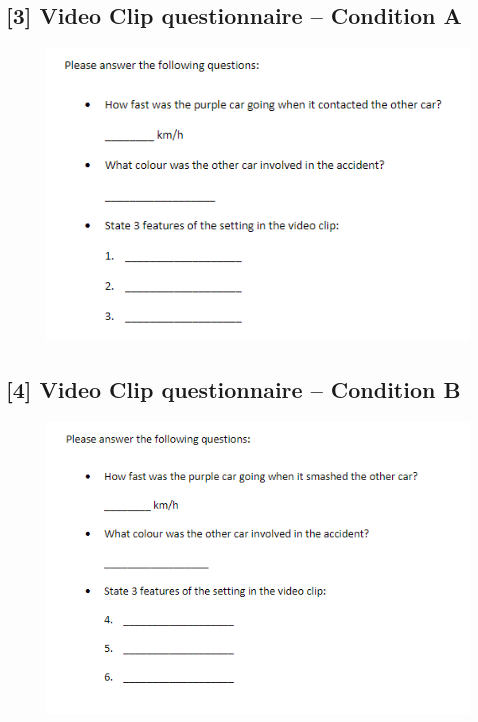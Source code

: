 \documentclass[12pt]{article}
\begin{document}
\subsection*{[3] Video Clip questionnaire -- Condition A}
\begin{figure}[H]
	\includegraphics{a_questionnaire}
	\centering
\end{figure}

\subsection*{[4] Video Clip questionnaire -- Condition B}
\begin{figure}[H]
	\includegraphics{b_questionnaire}
	\centering
\end{figure}
\end{document}
